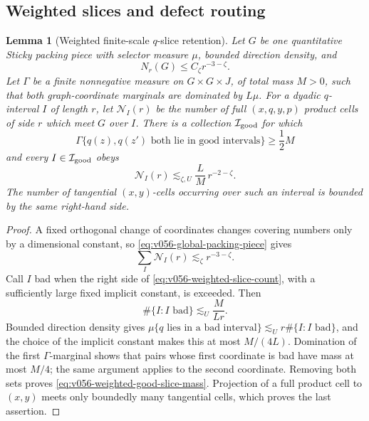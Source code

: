\documentclass[10pt]{article}
\newtheorem{lemma}[theorem]{Lemma}
\begin{document}
\subsection{Weighted slices and defect routing}

\begin{lemma}[Weighted finite-scale \(q\)-slice retention]
\label{lem:v056-weighted-q-slice-retention}
Let \(G\) be one quantitative Sticky packing piece with selector measure \(\mu\), bounded direction
density, and
\begin{equation}
\label{eq:v056-global-packing-piece}
N_r(G)\le C_\zeta r^{-3-\zeta}.
\end{equation}
Let \(\Gamma\) be a finite nonnegative measure on \(G\times G\times J\), of total mass
\(M>0\), such that both graph-coordinate marginals are dominated by \(L\mu\).  For a dyadic
\(q\)-interval \(I\) of length \(r\), let \(\mathcal N_I(r)\) be the number of full
\((x,q,y,p)\) product cells of side \(r\) which meet \(G\) over \(I\).  There is a collection
\(\mathcal I_{\rm good}\) for which
\begin{equation}
\label{eq:v056-weighted-good-slice-mass}
\boxed{
\Gamma\{q(z),q(z')\text{ both lie in good intervals}\}
\ge\frac12M
}
\end{equation}
and every \(I\in\mathcal I_{\rm good}\) obeys
\begin{equation}
\label{eq:v056-weighted-slice-count}
\boxed{
\mathcal N_I(r)
\lesssim_{\zeta,U}
\frac{L}{M}\,r^{-2-\zeta}.
}
\end{equation}
The number of tangential \((x,y)\)-cells occurring over such an interval is bounded by the same
right-hand side.
\end{lemma}

\begin{proof}
A fixed orthogonal change of coordinates changes covering numbers only by a dimensional constant,
so \eqref{eq:v056-global-packing-piece} gives
\[
\sum_I\mathcal N_I(r)
\lesssim_\zeta r^{-3-\zeta}.
\]
Call \(I\) bad when the right side of \eqref{eq:v056-weighted-slice-count}, with a sufficiently
large fixed implicit constant, is exceeded.  Then
\[
\#\{I:I\text{ bad}\}
\lesssim_U
\frac{M}{Lr}.
\]
Bounded direction density gives
\(
\mu\{q\text{ lies in a bad interval}\}
\lesssim_U r\#\{I:I\text{ bad}\}
\), and the choice of the implicit constant makes this at most \(M/(4L)\).  Domination of the first
\(\Gamma\)-marginal shows that pairs whose first coordinate is bad have mass at most \(M/4\); the
same argument applies to the second coordinate.  Removing both sets proves
\eqref{eq:v056-weighted-good-slice-mass}.  Projection of a full product cell to \((x,y)\) meets only
boundedly many tangential cells, which proves the last assertion.
\end{proof}
\end{document}
